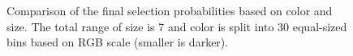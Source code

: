 \documentclass[letterpaper]{article}
\begin{document}
\begin{figure}[ht]
\centering
{}
\caption{
Comparison of the final selection probabilities based on color and size. The total range of size is 7 and color is split into 30 equal-sized bins based on RGB scale (smaller is darker).
}
\label{fig:plot-select}
\end{figure}
\end{document}
